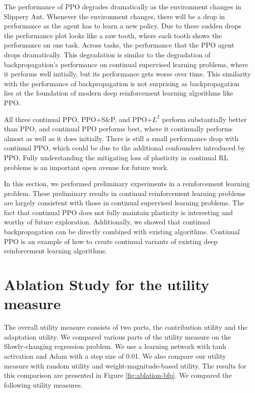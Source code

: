 \documentclass[review, number,3p]{elsarticle}
\begin{document}
The performance of PPO degrades dramatically as the environment changes in Slippery Ant. 
Whenever the environment changes, there will be a drop in performance as the agent has to learn a new policy.
Due to these sudden drops the performance plot looks like a saw tooth, where each tooth shows the performance on one task.
Across tasks, the performance that the PPO agent drops dramatically.
This degradation is similar to the degradation of backpropagation's performance on continual supervised learning problems, where it performs well initially, but its performance gets worse over time. 
This similarity with the performance of backpropagation is not surprising as backpropagation lies at the foundation of modern deep reinforcement learning algorithms like PPO.


All three continual PPO, PPO+S\&P, and PPO+$L^2$ perform substantially better than PPO, and continual PPO performs best, where it continually performs almost as well as it does initially.
There is still a small performance drop with continual PPO, which could be due to the additional confounders introduced by PPO.
Fully understanding the mitigating loss of plasticity in continual RL problems is an important open avenue for future work.

In this section, we performed preliminary experiments in a reinforcement learning problem.
These preliminary results in continual reinforcement learning problems are largely consistent with those in continual supervised learning problems.
The fact that continual PPO does not fully maintain plasticity is interesting and worthy of future exploration.
Additionally, we showed that continual backpropagation can be directly combined with existing algorithms.
Continual PPO is an example of how to create continual variants of existing deep reinforcement learning algorithms.


\section{Ablation Study for the utility measure}
\label{app:ablation}

The overall utility measure consists of two parts, the contribution utility and the adaptation utility. We compared various parts of the utility measure on the Slowly-changing regression problem. We use a learning network with tanh activation and Adam with a step size of 0.01. We also compare our utility measure with random utility and weight-magnitude-based utility. The results for this comparison are presented in Figure \ref{fig:ablation-bfp}. We compared the following utility measures.
\end{document}
